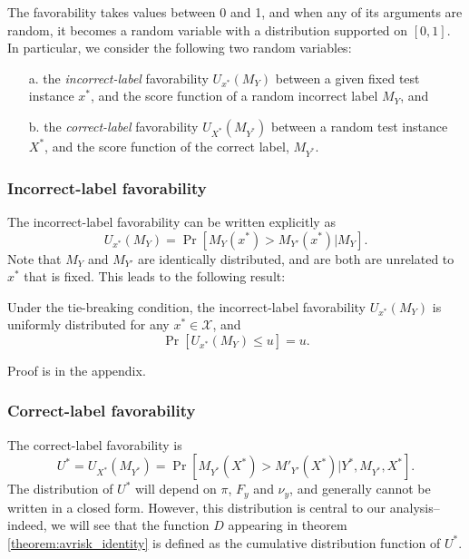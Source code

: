 \documentclass[twoside,11pt]{article}
\begin{document}
The favorability takes values between 0 and 1, and when any of its
arguments are random, it becomes a random variable with a distribution
supported on $[0,1]$.  In particular, we consider the following two
random variables:
\begin{itemize}
\item[a.] the \emph{incorrect-label} favorability $U_{x^*}(M_Y)$
  between a given fixed test instance $x^*$, and the score function of
  a random incorrect label $M_{Y}$, and
\item[b.] the \emph{correct-label} favorability $U_{X^*}(M_{Y^*})$
  between a random test instance $X^*$, and the score function of the
  correct label, $M_{Y^*}$.
\end{itemize}
\subsubsection{Incorrect-label favorability}
The incorrect-label favorability can be written explicitly as
\begin{equation}
U_{x^*}(M_Y) = \Pr[M_{Y}(x^*) > M_{Y'}(x^*)|M_{Y}].
\end{equation}
Note that $M_Y$ and $M_{Y'}$ are identically distributed, and are both
are unrelated to $x^*$ that is fixed. This leads to the following
result:
\begin{lemma}\label{lemma:U_function}
Under the tie-breaking condition, the incorrect-label favorability
$U_{x^*}(M_Y)$ is uniformly distributed for any $x^* \in \mathcal{X}$,
and \begin{equation}\label{eq:Uniform} \Pr[U_{x^*}(M_Y) \leq u] = u.
\end{equation}
\end{lemma}
Proof is in the appendix. 

\subsubsection{Correct-label favorability}

The correct-label favorability is 
\begin{equation}
U^* = U_{X^*}(M_{Y^*}) = \Pr[M_{Y^*}(X^*) > M'_{Y'}(X^*)|Y^*,M_{Y^*},X^*].
\end{equation}
The distribution of $U^*$ will depend on $\pi$, $F_y$ and $\nu_y$, and
generally cannot be written in a closed form.  However, this
distribution is central to our analysis--indeed, we will see that the
function ${D}$ appearing in theorem \ref{theorem:avrisk_identity}
is defined as the cumulative distribution function of $U^*$.
\end{document}

